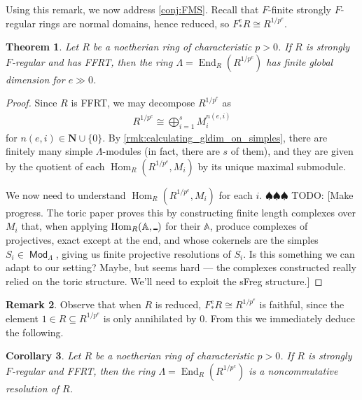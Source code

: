 \documentclass{amsart}
\newtheorem{thm}{Theorem}[section]
\newtheorem{cor}[thm]{Corollary}
\theoremstyle{definition}
\newtheorem{rmk}[thm]{Remark}
\def\Arg{\rule{1ex}{1pt}}
\newcommand{\NN}{\mathbf N}
\DeclareMathOperator{\End}{\operatorname{End}}
\DeclareMathOperator{\Hom}{\operatorname{Hom}}
\DeclareMathOperator{\Mod}{\mathsf{Mod}}
\newcommand{\Fe}{F_{*}^{e}}
\newcommand{\Rpe}{R^{1/p^{e}}}
\newcommand{\todo}[1]{{\color{teal} \sf $\spadesuit\spadesuit\spadesuit$ TODO: [#1]}}
\begin{document}
\bigbreak

Using this remark, we now address \cref{conj:FMS}. Recall that $F$-finite strongly $F$-regular rings are normal domains, hence reduced, so $\Fe R\cong\Rpe$. 

\bigbreak

\begin{thm}\label{thm:sFreg_FFRT_implies_gldim_fin}
Let $R$ be a noetherian ring of characteristic $p>0$. If $R$ is strongly $F$-regular and has FFRT, then the ring $\Lambda=\End_{R}(\Rpe)$ has finite global dimension for $e\gg0$.
\end{thm}

\bigbreak

\begin{proof}

Since $R$ is FFRT, we may decompose $\Rpe$ as
\begin{align*}
\Rpe\cong\bigoplus_{i=1}^{s}M_{i}^{n(e,i)}
\end{align*}
for $n(e,i)\in\NN\cup\{0\}$. By \cref{rmk:calculating_gldim_on_simples}, there are finitely many simple $\Lambda$-modules (in fact, there are $s$ of them), and they are given by the quotient of each $\Hom_{R}(\Rpe,M_{i})$ by its unique maximal submodule.

\bigbreak

We now need to understand $\Hom_{R}(\Rpe,M_{i})$ for each $i$. \todo{Make progress. The toric paper \cite{FMS19} proves this by constructing finite length complexes over $M_{i}$ that, when applying $\Hom_{R}(\mathbb{A},\Arg)$ for their $\mathbb{A}$, produce complexes of projectives, exact except at the end, and whose cokernels are the simples $S_{i}\in\Mod_{\Lambda}$, giving us finite projective resolutions of $S_{i}$. Is this something we can adapt to our setting? Maybe, but seems hard --- the complexes constructed really relied on the toric structure. We'll need to exploit the sFreg structure.}
\end{proof}

\bigbreak

\begin{rmk}\label{rmk:reduced_implies_faithful}
Observe that when $R$ is reduced, $\Fe R\cong\Rpe$ is faithful, since the element $1\in R\subseteq\Rpe$ is only annihilated by $0$. From this we immediately deduce the following.
\end{rmk}

\bigbreak

\begin{cor}\label{cor:sFreg_FFRT_implies_NCR}
Let $R$ be a noetherian ring of characteristic $p>0$. If $R$ is strongly $F$-regular and FFRT, then the ring $\Lambda=\End_{R}(\Rpe)$ is a noncommutative resolution of $R$.
\end{cor}
\end{document}
